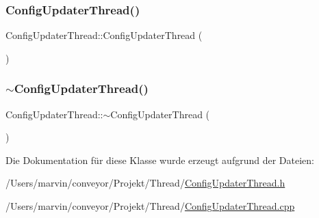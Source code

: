 \subsubsection{\texorpdfstring{Config\+Updater\+Thread()}{ConfigUpdaterThread()}}
{\footnotesize\ttfamily Config\+Updater\+Thread\+::\+Config\+Updater\+Thread (\begin{DoxyParamCaption}{ }\end{DoxyParamCaption})}

\hypertarget{class_config_updater_thread_a76b9050ee3e35fc85fd1b12eb2cb3ca4}{}\label{class_config_updater_thread_a76b9050ee3e35fc85fd1b12eb2cb3ca4} 
\subsubsection{\texorpdfstring{$\sim$\+Config\+Updater\+Thread()}{~ConfigUpdaterThread()}}
{\footnotesize\ttfamily Config\+Updater\+Thread\+::$\sim$\+Config\+Updater\+Thread (\begin{DoxyParamCaption}{ }\end{DoxyParamCaption})\hspace{0.3cm}{\ttfamily [virtual]}}



Die Dokumentation für diese Klasse wurde erzeugt aufgrund der Dateien\+:\begin{DoxyCompactItemize}
\item 
/\+Users/marvin/conveyor/\+Projekt/\+Thread/\hyperlink{_config_updater_thread_8h}{Config\+Updater\+Thread.\+h}\item 
/\+Users/marvin/conveyor/\+Projekt/\+Thread/\hyperlink{_config_updater_thread_8cpp}{Config\+Updater\+Thread.\+cpp}\end{DoxyCompactItemize}

